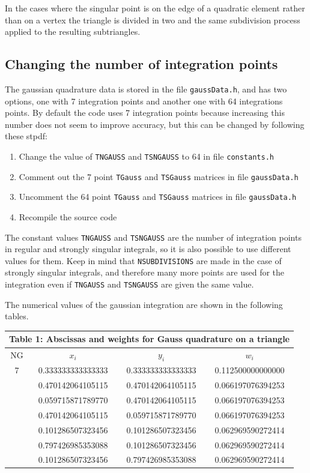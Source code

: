 \documentclass[12pt]{article}
\begin{document}
In the cases where the singular point is on the edge of a quadratic element rather than on a vertex the triangle is divided in two and the same subdivision process applied to the resulting subtriangles.

\subsection*{Changing the number of integration points}
The gaussian quadrature data is stored in the file \verb+gaussData.h+, and has two options, one with 7 integration points and another one with 64 integrations points. By default the code uses 7 integration points because increasing this number does not seem to improve accuracy, but this can be changed by following these stpdf:

\begin{enumerate}
\item Change the value of \verb+TNGAUSS+ and \verb+TSNGAUSS+ to 64 in file \verb+constants.h+
\item Comment out the 7 point \verb+TGauss+ and \verb+TSGauss+ matrices in file \verb+gaussData.h+
\item Uncomment the 64 point \verb+TGauss+ and \verb+TSGauss+ matrices in file \verb+gaussData.h+
\item Recompile the source code
\end{enumerate}

The constant values \verb+TNGAUSS+ and \verb+TSNGAUSS+ are the number of integration points in regular and strongly singular integrals, so it is also possible to use different values for them. Keep in mind that \verb+NSUBDIVISIONS+ are made in the case of strongly singular integrals, and therefore many more points are used for the integration even if \verb+TNGAUSS+ and \verb+TSNGAUSS+ are given the same value.

The numerical values of the gaussian integration are shown in the following tables.

\pagebreak
\begin{center}
\begin{tabular}{|c|c|c|c|}
\multicolumn{4}{c}{Table 1: Abscissas and weights for Gauss quadrature on a triangle}\\
\hline
NG & $x_i$ & $y_i$ & $w_i$\\
\hline\hline
7 & 0.333333333333333 & 0.333333333333333 & 0.112500000000000\\
 & 0.470142064105115 & 0.470142064105115 & 0.066197076394253\\
 & 0.059715871789770 & 0.470142064105115 & 0.066197076394253\\
 & 0.470142064105115 & 0.059715871789770 & 0.066197076394253\\
 & 0.101286507323456 & 0.101286507323456 & 0.062969590272414\\
 & 0.797426985353088 & 0.101286507323456 & 0.062969590272414\\
 & 0.101286507323456 & 0.797426985353088 & 0.062969590272414\\
  \hline
\end{tabular}
\end{center}
\end{document}
